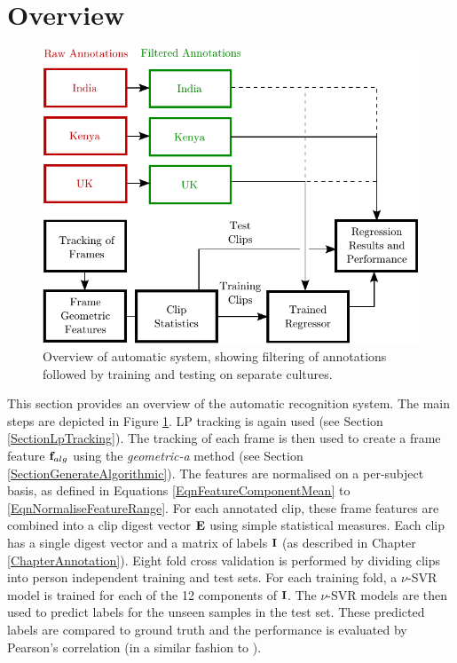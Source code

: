 
\section{Overview}
\label{SectionRegressionSystemOverview}

\begin{figure}
\centering
\includegraphics[width = 0.80 \columnwidth]{nvcregression/SystemOverview.pdf}
\caption{Overview of automatic system, showing filtering of annotations followed by training and testing on separate cultures.}
\label{SystemOverviewFigure}
\end{figure}

This section provides an overview of the automatic recognition system. The main steps are depicted in Figure \ref{SystemOverviewFigure}. \ac{LP} tracking is again used (see Section \ref{SectionLpTracking}). The tracking of each frame is then used to create a frame feature $\textbf{f}_{alg}$ using the \textit{geometric-a} method (see Section \ref{SectionGenerateAlgorithmic}). The features are normalised on a per-subject basis, as defined in Equations \ref{EqnFeatureComponentMean} to \ref{EqnNormaliseFeatureRange}. For each annotated clip, these frame features are combined into a clip digest vector $\textbf{E}$ using simple statistical measures. Each clip has a single digest vector and a matrix of labels $\textbf{I}$ (as described in Chapter \ref{ChapterAnnotation}). Eight fold cross validation is performed by dividing clips into person independent training and test sets. For each training fold, a $\nu$-SVR model is trained for each of the 12 components of $\textbf{I}$. The $\nu$-SVR models are then used to predict labels for the unseen samples in the test set. These predicted labels are compared to ground truth and the performance is evaluated by Pearson's correlation (in a similar fashion to \cite{Grimm2007, Kanluan2008}).

